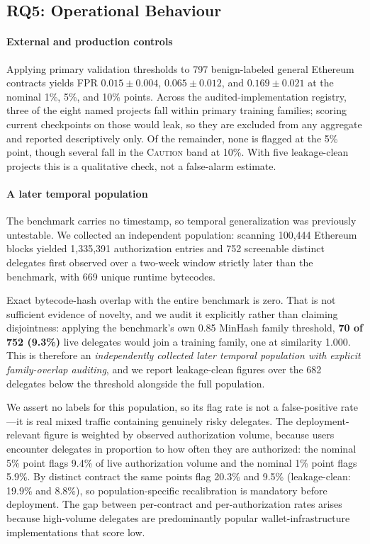 \documentclass[conference]{IEEEtran}
\begin{document}
\subsection{RQ5: Operational Behaviour}
\label{sec:rq5}

\paragraph*{External and production controls} Applying primary validation thresholds to 797 benign-labeled general Ethereum contracts yields FPR $0.015\pm0.004$, $0.065\pm0.012$, and $0.169\pm0.021$ at the nominal 1\%, 5\%, and 10\% points. Across the audited-implementation registry, three of the eight named projects fall within primary training families; scoring current checkpoints on those would leak, so they are excluded from any aggregate and reported descriptively only. Of the remainder, none is flagged at the 5\% point, though several fall in the \textsc{Caution} band at 10\%. With five leakage-clean projects this is a qualitative check, not a false-alarm estimate.

\paragraph*{A later temporal population} The benchmark carries no timestamp, so temporal generalization was previously untestable. We collected an independent population: scanning 100,444 Ethereum blocks yielded 1,335,391 authorization entries and 752 screenable distinct delegates first observed over a two-week window strictly later than the benchmark, with 669 unique runtime bytecodes.

Exact bytecode-hash overlap with the entire benchmark is zero. That is not sufficient evidence of novelty, and we audit it explicitly rather than claiming disjointness: applying the benchmark's own 0.85 MinHash family threshold, \textbf{70 of 752 (9.3\%)} live delegates would join a training family, one at similarity 1.000. This is therefore an \emph{independently collected later temporal population with explicit family-overlap auditing}, and we report leakage-clean figures over the 682 delegates below the threshold alongside the full population.

We assert no labels for this population, so its flag rate is not a false-positive rate---it is real mixed traffic containing genuinely risky delegates. The deployment-relevant figure is weighted by observed authorization volume, because users encounter delegates in proportion to how often they are authorized: the nominal 5\% point flags 9.4\% of live authorization volume and the nominal 1\% point flags 5.9\%. By distinct contract the same points flag 20.3\% and 9.5\% (leakage-clean: 19.9\% and 8.8\%), so population-specific recalibration is mandatory before deployment. The gap between per-contract and per-authorization rates arises because high-volume delegates are predominantly popular wallet-infrastructure implementations that score low.
\end{document}
